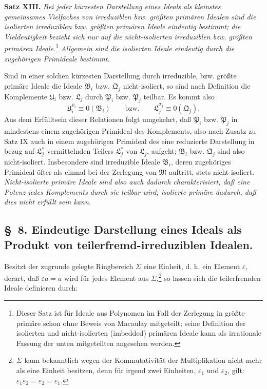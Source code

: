 \documentclass[11pt]{article}
\newcommand{\ideal}[1]{\mathfrak{#1}}
\begin{document}
\textbf{Satz XIII.} \emph{Bei jeder kürzesten Darstellung eines Ideals als kleinstes gemeinsames Vielfaches von irreduziblen bzw. größten primären Idealen sind die isolierten irreduziblen bzw. größten primären Ideale eindeutig bestimmt; die Vieldeutigkeit bezieht sich nur auf die nicht-isolierten irreduziblen bzw. größten primären Ideale.}\footnote{Dieser Satz ist für Ideale aus Polynomen im Fall der Zerlegung in größte primäre schon ohne Beweis von Macaulay mitgeteilt; seine Definition der isolierten und nicht-isolierten (imbedded) primären Ideale kann als irrationale Fassung der unten mitgeteilten angesehen werden.} \emph{Allgemein sind die isolierten Ideale eindeutig durch die zugehörigen Primideale bestimmt.}

Sind in einer solchen kürzesten Darstellung durch irreduzible, bzw. größte primäre Ideale die Ideale $\ideal B_i$ bzw. $\ideal Q_j$ nicht-isoliert, so sind nach Definition die Komplemente $\ideal U_i$ bzw. $\ideal L_j$ durch $\ideal P_i$ bzw. $\ideal P_j$ teilbar. Es kommt also
\[
 \ideal U_i^{\varrho_i}\equiv0(\ideal B_i)
 \qquad \text{bzw.} \qquad
 \ideal L_j^{\sigma_j}\equiv0(\ideal Q_j).
\]
Aus dem Erfülltsein dieser Relationen folgt umgekehrt, daß $\ideal P_i$ bzw. $\ideal P_j$ in mindestens einem zugehörigen Primideal des Komplements, also nach Zusatz zu Satz IX auch in einem zugehörigen Primideal des eine reduzierte Darstellung in bezug auf $\ideal L_j^*$ vermittelnden Teilers $\ideal L_j^*$ von $\ideal L_j$, aufgeht; $\ideal B_i$ bzw. $\ideal Q_j$ sind also nicht-isoliert. Insbesondere sind irreduzible Ideale $\ideal B_i$, deren zugehöriges Primideal öfter als einmal bei der Zerlegung von $\ideal M$ auftritt, stets nicht-isoliert. \emph{Nicht-isolierte primäre Ideale sind also auch dadurch charakterisiert, daß eine Potenz jedes Komplements durch sie teilbar wird; isolierte primäre dadurch, daß dies nicht erfüllt sein kann.}

\subsection*{\S~8. Eindeutige Darstellung eines Ideals als Produkt von teilerfremd-irreduziblen Idealen.}

Besitzt der zugrunde gelegte Ringbereich $\Sigma$ eine Einheit, d. h. ein Element $\varepsilon$, derart, daß $\varepsilon a=a$ wird für jedes Element aus $\Sigma$,\footnote{$\Sigma$ kann bekanntlich wegen der Kommutativität der Multiplikation nicht mehr als eine Einheit besitzen, denn für irgend zwei Einheiten, $\varepsilon_1$ und $\varepsilon_2$, gilt: $\varepsilon_1\varepsilon_2=\varepsilon_2=\varepsilon_1$.} so lassen sich die teilerfremden Ideale definieren durch:
\end{document}
